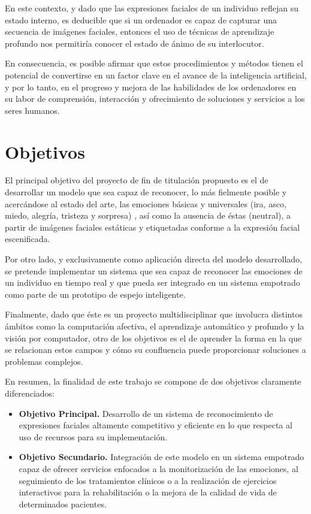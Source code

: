 En este contexto, y dado que las expresiones faciales de un individuo reflejan su estado interno, es deducible que si un ordenador es capaz de capturar una secuencia de imágenes faciales, entonces el uso de técnicas de aprendizaje profundo nos permitiría conocer el estado de ánimo de su interlocutor. 

En consecuencia, es posible afirmar que estos procedimientos y métodos tienen el potencial de convertirse en un factor clave en el avance de la inteligencia artificial, y por lo tanto, en el progreso y mejora de las habilidades de los ordenadores en su labor de comprensión, interacción y ofrecimiento de soluciones y servicios a los seres humanos.

\section{Objetivos}

El principal objetivo del proyecto de fin de titulación propuesto es el de desarrollar un modelo que sea capaz de reconocer, lo más fielmente posible y acercándose al estado del arte, las emociones básicas y universales (ira, asco, miedo, alegría, tristeza y sorpresa)  \cite{Ekman}, así como la ausencia de éstas (neutral), a partir de imágenes faciales estáticas y etiquetadas conforme a la expresión facial escenificada.

Por otro lado, y exclusivamente como aplicación directa del modelo desarrollado, se pretende implementar un sistema que sea capaz de reconocer las emociones de un individuo en tiempo real y que pueda ser integrado en un sistema empotrado como parte de un prototipo de espejo inteligente.

Finalmente, dado que éste es un proyecto multidisciplinar que involucra distintos ámbitos como la computación afectiva, el aprendizaje automático y profundo y la visión por computador, otro de los objetivos es el de aprender la forma en la que se relacionan estos campos y cómo su confluencia puede proporcionar soluciones a problemas complejos.

En resumen, la finalidad de este trabajo se compone de dos objetivos claramente diferenciados:
\begin{itemize}
  \item \textbf{Objetivo Principal.} Desarrollo de un sistema de reconocimiento de expresiones faciales altamente competitivo y eficiente en lo que respecta al uso de recursos para su implementación.
  \item \textbf{Objetivo Secundario.} Integración de este modelo en un sistema empotrado capaz de ofrecer servicios enfocados a la monitorización de las emociones, al seguimiento de los tratamientos clínicos o a la realización de ejercicios interactivos para la rehabilitación o la mejora de la calidad de vida de determinados pacientes.

\end{itemize}

